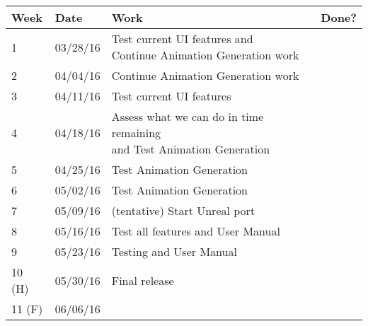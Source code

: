 \begin{table}[H]
\centering
\begin{tabular}{|l|l|l|l|}
\hline
Week 	& Date	 		& Work	 		& 	Done?	 \\ \hline
1		& 03/28/16	 	& \specialcell{Test current UI features and \\ Continue Animation Generation work	}	& 			 \\ \hline
2		& 04/04/16	 	& Continue Animation Generation work		& 			 \\ \hline
3		& 04/11/16	 	& Test current UI features		& 			 \\ \hline
4		& 04/18/16	 	& \specialcell{Assess what we can do in time remaining \\ and Test Animation Generation}		& 			 \\ \hline
5		& 04/25/16	 	& Test Animation Generation		& 			 \\ \hline
6		& 05/02/16	 	& Test Animation Generation		& 			 \\ \hline
7		& 05/09/16	 	& (tentative) Start Unreal port		& 			 \\ \hline
8		& 05/16/16	 	& Test all features and User Manual		& 			 \\ \hline
9		& 05/23/16	 	& Testing and User Manual		& 			 \\ \hline
10 (H)	& 05/30/16	 	& Final release		& 			 \\ \hline
11 (F)	& 06/06/16	 	& 		& 			 \\ \hline
\end{tabular}
\end{table}
